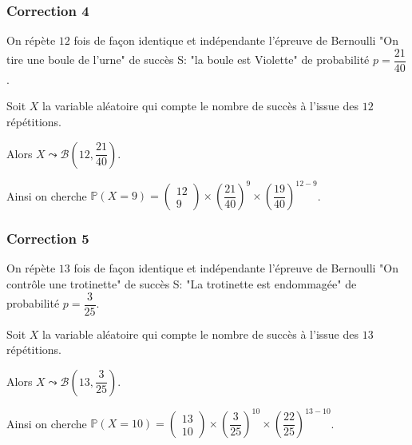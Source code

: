 \documentclass[15pt, mathserif]{beamer}
\begin{document}
\begin{frame}
\vspace{-10mm}
	\frametitle{Correction 4}
On répète $12$ fois de façon identique et indépendante l'épreuve de Bernoulli "On tire une boule de l'urne" de succès S: "la boule est Violette"  de probabilité $p =\dfrac{21}{40}$.

Soit $X$ la variable aléatoire qui compte le nombre de succès à l'issue des $12$ répétitions.

 Alors $X \leadsto \mathcal{B}\left(12,\dfrac{21}{40}\right)$.

Ainsi on cherche $\mathbb{P}(X = 9) = \begin{pmatrix}12\\9\end{pmatrix}\times\left(\dfrac{21}{40}\right)^{9}\times\left(\dfrac{19}{40}\right)^{12-9}$.\end{frame}


\begin{frame}
\vspace{-10mm}
	\frametitle{Correction 5}
On répète $13$ fois de façon identique et indépendante l'épreuve de Bernoulli "On contrôle une trotinette" de succès S: "La trotinette est endommagée" de probabilité $p =\dfrac{3}{25}$.

Soit $X$ la variable aléatoire qui compte le nombre de succès à l'issue des $13$ répétitions.

 Alors $X \leadsto \mathcal{B}\left(13,\dfrac{3}{25}\right)$.

Ainsi on cherche $\mathbb{P}(X = 10) = \begin{pmatrix}13\\10\end{pmatrix}\times\left(\dfrac{3}{25}\right)^{10}\times\left(\dfrac{22}{25}\right)^{13-10}$.\end{frame}
\end{document}
